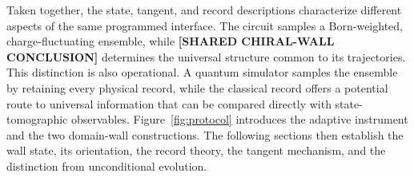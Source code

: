 \documentclass[aps,prx,twocolumn,superscriptaddress,longbibliography,nofootinbib,floatfix]{revtex4-2}
\newcommand{\ResultPlaceholder}[1]{\ignorespaces}
\newcommand{\ResultValue}[1]{\textcolor{BrickRed}{\textbf{[#1]}}}
\begin{document}
Taken together, the state, tangent, and record descriptions characterize different aspects of the same programmed interface.  The circuit samples a Born-weighted, charge-fluctuating ensemble, while \ResultValue{SHARED CHIRAL-WALL CONCLUSION} determines the universal structure common to its trajectories.  This distinction is also operational.  A quantum simulator samples the ensemble by retaining every physical record, while the classical record offers a potential route to universal information that can be compared directly with state-tomographic observables.  Figure~\ref{fig:protocol} introduces the adaptive instrument and the two domain-wall constructions.  The following sections then establish the wall state, its orientation, the record theory, the tangent mechanism, and the distinction from unconditional evolution.
\ResultPlaceholder{Headline acceptance test: after deriving the replica normalization, the defect-subtracted record self-information must exhibit a common conformal finite-size collapse, with the same sector data obtained from independent record-transfer estimators.}
\end{document}
